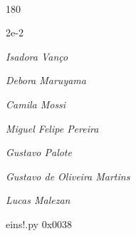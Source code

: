 \documentclass[12pt]{article}
\begin{document}

\pagebreak			

	\ 
	\vfill
	\begin{turn}{180}	
		\begin{minipage}{\textwidth}
		  	\ttfamily %
			\centering
			{\Huge 2e-2}
		  
			\hfill
		  
			

\textit{\small Isadora Vanço}

\textit{\small Debora Maruyama}

\textit{\small Camila Mossi}

\textit{\small Miguel Felipe Pereira}

\textit{\small Gustavo Palote}

\textit{\small Gustavo de Oliveira Martins}

\textit{\small Lucas Malezan}

\bigskip

eins!.py
0x0038


		\end{minipage}	
	\end{turn}
	\vfill
	\

\pagebreak
\end{document}
